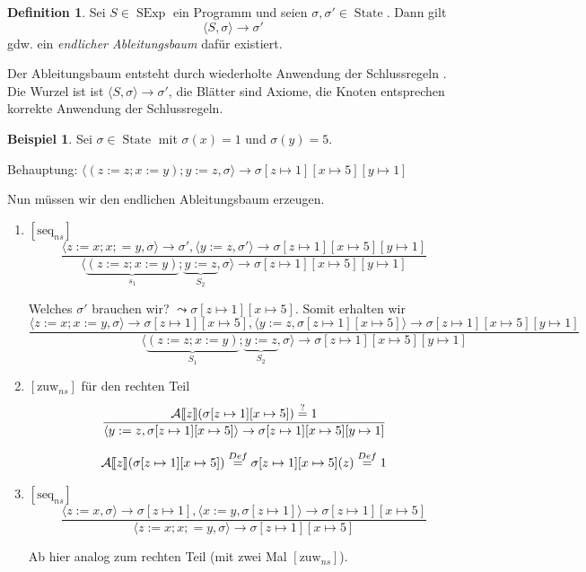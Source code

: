 \documentclass[a4paper,12pt]{article}
\theoremstyle{definition}
\newtheorem*{example}{Beispiel}
\newtheorem{definition}{Definition}[section]
\theoremstyle{plain}
\theoremstyle{remark}
\newcommand{\lsem}{\mathrm{[}\kern-.14em\mathrm{[}}
\newcommand{\rsem}{\mathrm{]}\kern-.14em\mathrm{]}}
\newcommand{\Asem}[1]{\mathcal{A}\lsem#1\rsem}
\DeclareMathOperator{\SExp}{SExp}
\DeclareMathOperator{\State}{State}
\begin{document}
\begin{definition}
    Sei $S \in \SExp$ ein Programm und seien $\sigma, \sigma' \in \State$. Dann gilt
    $$\langle S, \sigma \rangle \to \sigma'$$ gdw. ein \emph{endlicher Ableitungsbaum} dafür existiert.

    Der Ableitungsbaum entsteht durch wiederholte Anwendung der Schlussregeln . Die Wurzel ist ist $\langle S, \sigma \rangle \to \sigma'$, die Blätter sind Axiome, die Knoten entsprechen  korrekte Anwendung der Schlussregeln.
\end{definition}

\begin{example}
    Sei $\sigma \in \State$ mit $\sigma(x) = 1$ und $\sigma(y) = 5$.

    Behauptung: $\langle (z := z; x := y); y := z, \sigma \rangle \to \sigma[z \mapsto 1][x \mapsto 5][y \mapsto 1]$

    Nun müssen wir den endlichen Ableitungsbaum erzeugen.


    \begin{enumerate}
        \item $[\text{seq}_{ns}]$
            $$\frac{\langle z := x; x ;= y, \sigma \rangle \to \sigma', \langle y := z, \sigma' \rangle \to \sigma[z \mapsto 1][x \mapsto 5][y \mapsto 1]}{\langle \underbrace{(z := z; x := y)}_{s_1}; \underbrace{y := z}_{S_2}, \sigma \rangle \to \sigma[z \mapsto 1][x \mapsto 5][y \mapsto 1]}$$

            Welches $\sigma'$ brauchen wir? $\leadsto \sigma[z \mapsto 1][x \mapsto 5]$. Somit erhalten wir
            $$\frac{\langle z := x; x := y, \sigma \rangle \to \sigma[z \mapsto 1][x \mapsto 5], \langle y := z, \sigma[z \mapsto 1][x \mapsto 5] \rangle \to \sigma[z \mapsto 1][x \mapsto 5][y \mapsto 1]}{\langle \underbrace{(z := z; x := y)}_{S_1}; \underbrace{y := z}_{S_2}, \sigma \rangle \to \sigma[z \mapsto 1][x \mapsto 5][y \mapsto 1]}$$

        \item $[\text{zuw}_{ns}]$ für den rechten Teil
            $$\frac{\Asem{z}(\sigma[z \mapsto 1][x \mapsto 5]) \overset{?}{=} 1}{\langle y := z, \sigma[z \mapsto 1][x \mapsto 5] \rangle \to \sigma[z \mapsto 1][x \mapsto 5][y \mapsto 1]}$$

            $$\Asem{z}(\sigma[z \mapsto 1][x \mapsto 5]) \overset{Def}{=} \sigma[z \mapsto 1][x \mapsto 5](z) \overset{Def}{=} 1$$

        \item $[\text{seq}_{ns}]$
            $$\frac{\langle z := x, \sigma \rangle \to \sigma[z \mapsto 1], \langle x := y, \sigma[z \mapsto 1] \rangle \to \sigma[z \mapsto 1][x \mapsto 5]}{\langle z := x; x ;= y, \sigma \rangle \to \sigma[z \mapsto 1][x \mapsto 5]}$$

            Ab hier analog zum rechten Teil (mit zwei Mal $[\text{zuw}_{ns}]$).
    \end{enumerate}
\end{example}
\end{document}
